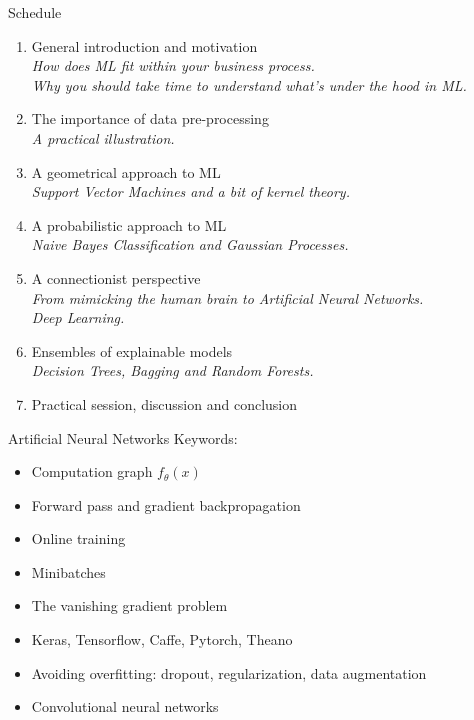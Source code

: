 \documentclass{beamer}
\begin{document}
\begin{frame}{Schedule}
\begin{enumerate}
\item General introduction and motivation \Checkmark \\
{\small \it How does ML fit within your business process.\\
Why you should take time to understand what's under the hood in ML.}
\item The importance of data pre-processing \Checkmark \\
{\small \it A practical illustration.}
\item A geometrical approach to ML \Checkmark \\
{\small \it Support Vector Machines and a bit of kernel theory.}
\item A probabilistic approach to ML \Checkmark \\
{\small \it Naive Bayes Classification and Gaussian Processes.}
\item A connectionist perspective \\
{\small \it From mimicking the human brain to Artificial Neural Networks.\\
Deep Learning.}
\item Ensembles of explainable models\\
{\small \it Decision Trees, Bagging and Random Forests.}
\item Practical session, discussion and conclusion
\end{enumerate}
\end{frame}

\begin{frame}{Artificial Neural Networks}
Keywords:
\begin{itemize}
\item Computation graph $f_\theta(x)$
\item Forward pass and gradient backpropagation
\item Online training
\item Minibatches
\item The vanishing gradient problem
\item Keras, Tensorflow, Caffe, Pytorch, Theano
\item Avoiding overfitting: dropout, regularization, data augmentation
\item Convolutional neural networks
\end{itemize}
\end{frame}
\end{document}
